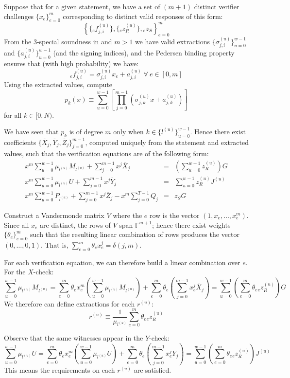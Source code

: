 \documentclass[draft]{article} %
\newcommand{\F}{\mathbb{F}}
\newcommand{\sumj}{\sum_{j=0}^{m-1}}
\newcommand{\sumu}{\sum_{u=0}^{w-1}}
\begin{document}
Suppose that for a given statement, we have a set of $(m+1)$ distinct verifier challenges $\{x_e\}_{e=0}^m$ corresponding to distinct valid responses of this form:
$$\left\{ \{{}_ef^{(u)}_{j,i}\}, \{{}_ez^{(u)}_R\}, {}_ez_S \right\}_{e=0}^m$$
From the $3$-special soundness in \cite{bootle} and $m > 1$ we have valid extractions $\{\sigma^{(u)}_{j,i}\}_{u=0}^{w-1}$ and $\{a^{(u)}_{j,i}\}_{u=0}^{w-1}$ (and the signing indices), and the Pedersen binding property ensures that (with high probability) we have:
$${}_ef^{(u)}_{j,i} = \sigma^{(u)}_{j,i}x_e + a^{(u)}_{j,i} \; \forall \: e \in [0,m]$$
Using the extracted values, compute
$$p_k(x) \equiv \sum_{u=0}^{w-1}\left[ \prod_{j=0}^{m-1} \left( \sigma^{(u)}_{j,k}x + a^{(u)}_{j,k} \right) \right]$$
for all $k \in [0,N)$.

We have seen that $p_k$ is of degree $m$ only when $k \in \{l^{(u)}\}_{u=0}^{w-1}$.
Hence there exist coefficients $\{\overline{X}_j,\overline{Y}_j,\overline{Z}_j\}_{j=0}^{m-1}$, computed uniquely from the statement and extracted values, such that the verification equations are of the following form:
\begin{eqnarray*}
x^m \sumu \mu_{l^{(u)}}M_{l^{(u)}} + \sumj x^j\overline{X}_j &=& \left( \sumu z^{(u)}_R \right)G \\
x^m \sumu \mu_{l^{(u)}}U + \sumj x^j\overline{Y}_j &=& \sumu z^{(u)}_RJ^{(u)} \\
x^m \sumu P_{l^{(u)}} + \sumj x^j\overline{Z}_j - x^m \sum_{j=0}^{T-1} Q_j &=& z_SG
\end{eqnarray*}

Construct a Vandermonde matrix $V$ where the $e$ row is the vector $(1,x_e,\ldots,x^m_e)$.
Since all $x_e$ are distinct, the rows of $V$ span $\F^{m+1}$; hence there exist weights $\{\theta_e\}_{e=0}^m$ such that the resulting linear combination of rows produces the vector $(0,\ldots,0,1)$.
That is, $\sum_{e=0}^m \theta_ex_e^j = \delta(j,m)$.

For each verification equation, we can therefore build a linear combination over $e$. For the $X$-check:
$$\sumu \mu_{l^{(u)}} M_{l^{(u)}} = \sum_{e=0}^m \theta_ex_e^m \left( \sumu \mu_{l^{(u)}} M_{l^{(u)}} \right) + \sum_{e=0}^m \theta_e \left( \sumj x_e^j \overline{X}_j \right) = \sumu \left( \sum_{e=0}^m \theta_e {}_ez^{(u)}_R \right) G$$
We therefore can define extractions for each $r^{(u)}$:
$$r^{(u)} \equiv \frac{1}{\mu_{l^{(u)}}} \sum_{e=0}^m \theta_e {}_ez^{(u)}_R$$

Observe that the same witnesses appear in the $Y$-check:
$$\sumu \mu_{l^{(u)}} U = \sum_{e=0}^m \theta_ex_e^m \left( \sumu \mu_{l^{(u)}} U \right) + \sum_{e=0}^m \theta_e \left( \sumj x_e^j \overline{Y}_j \right) = \sumu \left( \sum_{e=0}^m \theta_e {}_ez^{(u)}_R \right) J^{(u)}$$
This means the requirements on each $r^{(u)}$ are satisfied.
\end{document}
